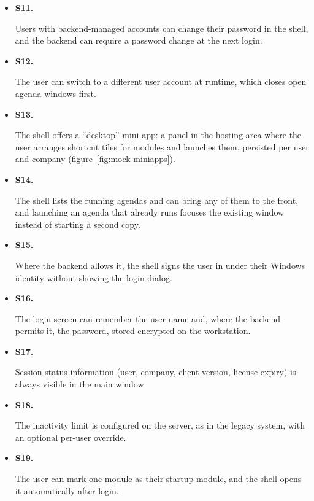 \documentclass{article}
\newcommand{\reqdef}[1]{\hypertarget{req:#1}{\textbf{#1.}}}
\begin{document}
\begin{itemize}
  \item \reqdef{S11} Users with backend-managed accounts can change their password in the shell, and the backend can require a password change at the next login.
  \item \reqdef{S12} The user can switch to a different user account at runtime, which closes open agenda windows first.
  \item \reqdef{S13} The shell offers a ``desktop'' mini-app: a panel in the hosting area where the user arranges shortcut tiles for modules and launches them, persisted per user and company (figure~\ref{fig:mock-miniapps}).
  \item \reqdef{S14} The shell lists the running agendas and can bring any of them to the front, and launching an agenda that already runs focuses the existing window instead of starting a second copy.
  \item \reqdef{S15} Where the backend allows it, the shell signs the user in under their Windows identity without showing the login dialog.
  \item \reqdef{S16} The login screen can remember the user name and, where the backend permits it, the password, stored encrypted on the workstation.
  \item \reqdef{S17} Session status information (user, company, client version, license expiry) is always visible in the main window.
  \item \reqdef{S18} The inactivity limit is configured on the server, as in the legacy system, with an optional per-user override.
  \item \reqdef{S19} The user can mark one module as their startup module, and the shell opens it automatically after login.
\end{itemize}
\end{document}
